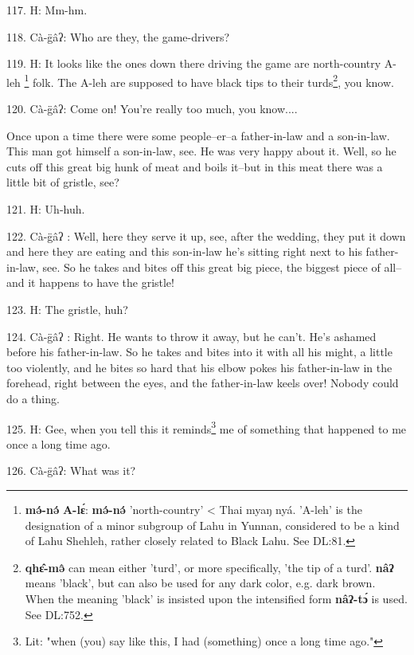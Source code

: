 117. H: Mm-hm.

118. Cà-g̈âʔ: Who are they, the game-drivers?

119. H: It looks like the ones down there driving the game are north-country A-leh
\footnote{\textbf{mə́-nə́} \textbf{A-lɛ́}: \textbf{mə́-nə́} 'north-country' < Thai myaŋ nyá. 'A-leh' is the designation of a minor subgroup of Lahu in Yunnan, considered to be a kind of Lahu Shehleh, rather closely related to Black Lahu. See DL:81.} folk. The A-leh are supposed to have black tips to their turds\footnote{\textbf{qhɛ̂-mə̂} can mean either 'turd', or more specifically, 'the tip of a turd'. \textbf{nâʔ} means 'black', but can also be used for any dark color, e.g. dark brown. When the meaning 'black' is insisted upon the intensified form \textbf{nâʔ-tɔ́} is used. See DL:752.}, you know.

120. Cà-g̈âʔ: Come on! You're really too much, you know....

\begin{center}
\end{center}

Once upon a time there were some people--er--a father-in-law and a son-in-law.
This man got himself a son-in-law, see. He was very happy about it. Well, so he
cuts off this great big hunk of meat and boils it--but in this meat there was a
little bit of gristle, see?

121. H: Uh-huh.

122. Cà-g̈âʔ : Well, here they serve it up, see, after the wedding, they put
it down and here they are eating and this son-in-law he's sitting right next to
his father-in-law, see. So he takes and bites off this great big piece, the biggest
piece of all--and it happens to have the gristle!

123. H: The gristle, huh?

124. Cà-g̈âʔ : Right. He wants to throw it away, but he can't. He's ashamed
before his father-in-law. So he takes and bites into it with all his might, a little
too violently, and he bites so hard that his elbow pokes his father-in-law in the
forehead, right between the eyes, and the father-in-law keels over! Nobody could
do a thing.

125. H: Gee, when you tell this it reminds\footnote{Lit: "when (you) say like this, I had (something) once a long time ago."} me of something that happened to
me once a long time ago.

126. Cà-g̈âʔ: What was it?

